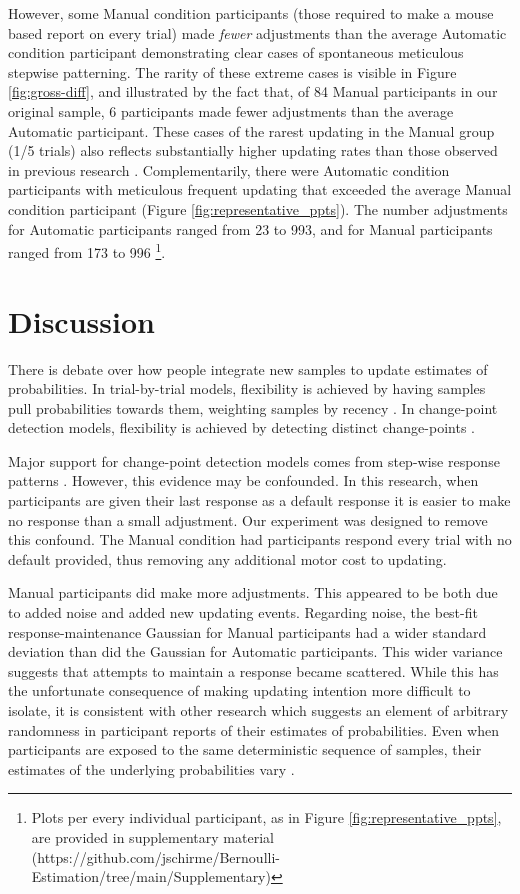 \documentclass[sn-apa]{sn-jnl}\usepackage[]{graphicx}\usepackage[]{xcolor}
\begin{document}
However, some Manual condition participants (those required to make a mouse based report on every trial) made \emph{fewer} adjustments than the average Automatic condition participant demonstrating clear cases of spontaneous meticulous stepwise patterning. The rarity of these extreme cases is visible in Figure \ref{fig:gross-diff}, and illustrated by the fact that, of 84 Manual participants in our original sample, 6 participants made fewer adjustments than the average Automatic participant. These cases of the rarest updating in the Manual group (1/5 trials) also reflects substantially higher updating rates than those observed in previous research \cite{gallistel2014, ricci2017,khaw2017}. Complementarily, there were Automatic condition participants with meticulous frequent updating that exceeded the average Manual condition participant (Figure \ref{fig:representative_ppts}). The number adjustments for Automatic participants ranged from  23 to 993, and for Manual participants ranged from 173 to 996 \footnote{Plots per every individual participant, as in Figure \ref{fig:representative_ppts},  are provided in supplementary material (https://github.com/jschirme/Bernoulli-Estimation/tree/main/Supplementary)}.



\section{Discussion}\label{sec-disc}

There is debate over how people integrate new samples to update estimates of probabilities. In trial-by-trial models, flexibility is achieved by having samples pull probabilities towards them, weighting samples by recency \citep{forsgren2023further,nassar2010,nassar2012,brown2009,krugel2009,steyvers2005}. In change-point detection models, flexibility is achieved by detecting distinct change-points \citep{gallistel2014}.

Major support for change-point detection models comes from step-wise response patterns \citep{gallistel2014, ricci2017}. However, this evidence may be confounded. In this research, when participants are given their last response as a default response it is easier to make no response than a small adjustment. Our experiment was designed to remove this confound. The Manual condition had participants respond every trial with no default provided, thus removing any additional motor cost to updating.

Manual participants did make more adjustments. This appeared to be both due to added noise and added new updating events. Regarding noise, the best-fit response-maintenance Gaussian for Manual participants had a wider standard deviation than did the Gaussian for Automatic participants. This wider variance suggests that attempts to maintain a response became scattered. While this has the unfortunate consequence of making updating intention more difficult to isolate, it is consistent with other research which suggests an element of arbitrary randomness in participant reports of their estimates of probabilities. Even when participants are exposed to the same deterministic sequence of samples, their estimates of the underlying probabilities vary \citep{prat2024}. 
\end{document}
